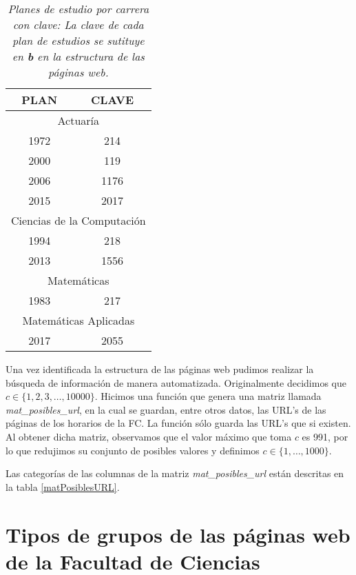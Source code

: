 \begin{table}[h]
\centering
\begin{tabular}{|c|c|}
 \hline 
  \textbf{PLAN} & \textbf{CLAVE} \\ 
 \hline 
 \multicolumn{2}{|c|}{Actuaría} \\ 
 \hline 
 1972 & 214 \\ 
 \hline 
 2000 & 119 \\ 
 \hline 
 2006 & 1176 \\ 
 \hline 
 2015 & 2017 \\ 
 \hline 
 \multicolumn{2}{|c|}{Ciencias de la Computación} \\ 
 \hline 
 1994 & 218 \\ 
 \hline 
 2013 & 1556 \\ 
 \hline 
 \multicolumn{2}{|c|}{Matemáticas} \\ 
 \hline 
 1983 & 217 \\ 
 \hline 
 \multicolumn{2}{|c|}{Matemáticas Aplicadas} \\ 
 \hline 
 2017 & 2055 \\ 
 \hline 
 \end{tabular}
\caption[\textit{Planes de estudio por carrera con clave}]{\textit{Planes de estudio por carrera con clave: La clave de cada plan de estudios se sutituye en \textbf{b} en la estructura de las páginas web.}}\label{PlanesEstudio}
\end{table}

Una vez identificada la estructura de las páginas web pudimos realizar la búsqueda de información de manera automatizada. Originalmente decidimos que $c \in \{1,2,3, \ldots, 10 000\}$. Hicimos una función que genera una matriz llamada \textit{mat\_posibles\_url}, en la cual se guardan, entre otros datos, las URL's de las páginas de los horarios de la FC. La función sólo guarda las URL's que si existen. Al obtener dicha matriz, observamos que el valor máximo que toma $c$ es 991, por lo que redujimos su conjunto de posibles valores y definimos $c \in \{1, \ldots, 1 000\}$.

Las categorías de las columnas de la matriz \textit{mat\_posibles\_url} están descritas en la tabla \ref{matPosiblesURL}.

\dfNmatrizChica %


\section{Tipos de grupos de las páginas web de la Facultad de Ciencias} \label{TiposDeGpos}

